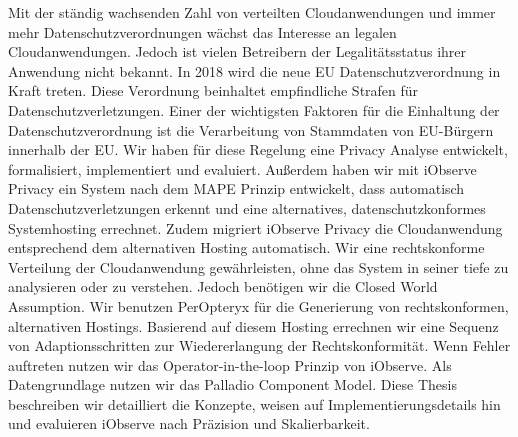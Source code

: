 
\Abstract

Mit der ständig wachsenden Zahl von verteilten Cloudanwendungen und immer mehr Datenschutzverordnungen wächst das Interesse an legalen Cloudanwendungen. Jedoch ist vielen Betreibern der Legalitätsstatus ihrer Anwendung nicht bekannt. In 2018 wird die neue EU Datenschutzverordnung in Kraft treten. Diese Verordnung beinhaltet empfindliche Strafen für Datenschutzverletzungen. Einer der wichtigsten Faktoren für die Einhaltung der Datenschutzverordnung ist die Verarbeitung von Stammdaten von EU-Bürgern innerhalb der EU. Wir haben für diese Regelung eine Privacy Analyse entwickelt, formalisiert, implementiert und evaluiert. Außerdem haben wir mit iObserve Privacy ein System nach dem MAPE Prinzip entwickelt, dass automatisch Datenschutzverletzungen erkennt und eine alternatives, datenschutzkonformes Systemhosting errechnet. Zudem migriert iObserve Privacy die Cloudanwendung entsprechend dem alternativen Hosting automatisch. Wir eine rechtskonforme Verteilung der Cloudanwendung gewährleisten, ohne das System in seiner tiefe zu analysieren oder zu verstehen. Jedoch benötigen wir die Closed World Assumption. Wir benutzen PerOpteryx für die Generierung von rechtskonformen, alternativen Hostings. Basierend auf diesem Hosting errechnen wir eine Sequenz von Adaptionsschritten zur Wiedererlangung der Rechtskonformität.  Wenn Fehler auftreten nutzen wir das Operator-in-the-loop Prinzip von iObserve. Als Datengrundlage nutzen wir das Palladio Component Model. Diese Thesis beschreiben wir detailliert die Konzepte, weisen auf Implementierungsdetails hin und evaluieren iObserve nach Präzision und Skalierbarkeit.

